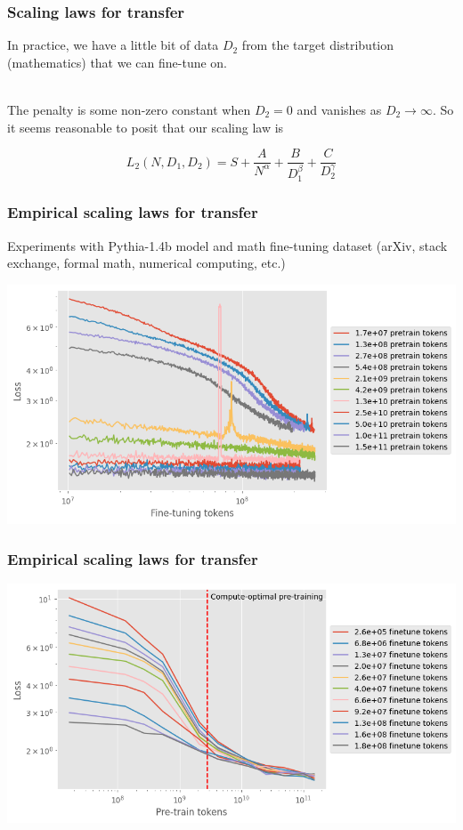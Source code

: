 \documentclass[handout]{beamer}
\begin{document}
\begin{frame}
\frametitle{Scaling laws for transfer}
In practice, we have a little bit of data $D_2$ from the target distribution (mathematics) that we can fine-tune on. \\~\

The penalty is some non-zero constant when $D_2=0$ and vanishes as $D_2\to\infty$. So it seems reasonable to posit that our scaling law is 

$$L_2(N, D_1, D_2) = S + \frac{A}{N^\alpha} + \frac{B}{D_1^\beta} + \frac{C}{D_2^\gamma}$$
\end{frame}

\begin{frame}
\frametitle{Empirical scaling laws for transfer}
Experiments with Pythia-1.4b model and math fine-tuning dataset (arXiv, stack exchange, formal math, numerical computing, etc.)
\begin{center}
    \includegraphics[width=1\textwidth]{img/ex1.png}
\end{center}
\end{frame}
\begin{frame}
\frametitle{Empirical scaling laws for transfer}
\begin{center}
    \includegraphics[width=1\textwidth]{img/ex2.png}
\end{center}
\end{frame}
\end{document}
